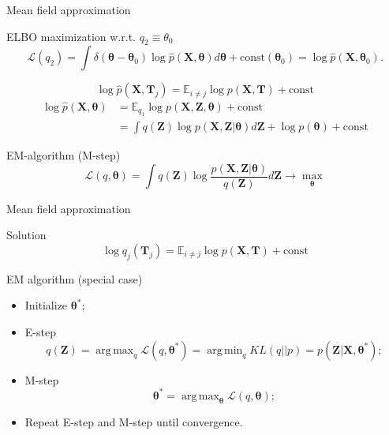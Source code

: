 \documentclass{beamer}
\newcommand{\bT}{\mathbf{T}}
\newcommand{\bX}{\mathbf{X}}
\newcommand{\bZ}{\mathbf{Z}}
\newcommand{\btheta}{\boldsymbol{\theta}}
\DeclareMathOperator*{\argmin}{arg\,min}
\DeclareMathOperator*{\argmax}{arg\,max}
\begin{document}
\begin{frame}{Mean field approximation}
	
	\begin{block}{ELBO maximization w.r.t. $q_2 \equiv \theta_0$}
		\vspace{-0.3cm}
		\[
			\mathcal{L} (q_2) = \int \delta(\btheta - \btheta_0) \log \hat{p}(\bX, \btheta) d\btheta + \text{const}(\btheta_0) = \log \hat{p}(\bX, \btheta_0).
		\]
	\end{block}
	\vspace{-0.3cm}
	\[
		\log \hat{p}(\bX, \bT_j) = \mathbb{E}_{i \neq j} \log p(\bX, \bT) + \text{const}
	\]
	\begin{align*}
		\log \hat{p}(\bX, \btheta) &= \mathbb{E}_{q_1} \log p(\bX, \bZ, \btheta) + \text{const} \\
		&= \int q(\bZ) \log p(\bX, \bZ|  \btheta) d\bZ + \log p(\btheta)+ \text{const}
	\end{align*}
	\vspace{-0.3cm}
	\begin{block}{EM-algorithm (M-step)}
		 \[
		 	\mathcal{L}(q, \btheta) =	\int q(\bZ) \log \frac{p(\bX, \bZ | \btheta)}{q(\bZ)}d\bZ \rightarrow \max_{\btheta}
		 \]
	\end{block}
\end{frame}
\begin{frame}{Mean field approximation}
    \begin{block}{Solution}
    \[
        \log q_j(\bT_j) = \mathbb{E}_{i \neq j} \log p(\bX, \bT) + \text{const}
    \]
    \end{block}

	\begin{block}{EM algorithm (special case)}
	\begin{itemize}
		\item Initialize $\btheta^*$;
		\item E-step
		\[
			q(\bZ) = \argmax_q \mathcal{L} (q, \btheta^*) = \argmin_q KL(q || p) =
			 p(\bZ| \bX, \btheta^*);
		\]
		\item M-step
		\[
			\btheta^* = \argmax_{\btheta} \mathcal{L} (q, \btheta);
		\]
		\item Repeat E-step and M-step until convergence.
	\end{itemize}
	\end{block}
\end{frame}
\end{document}
